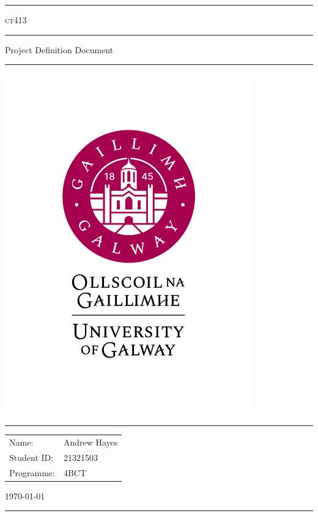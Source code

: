 \documentclass[a4paper,11pt]{article}
\author{Andrew Hayes}
\begin{document}
\begin{titlepage}
    \begin{center}
        \hrule
        \vspace*{0.6cm}
        \Huge \textsc{ct413}
        \vspace*{0.6cm}
        \hrule
        \LARGE
       \vspace{0.5cm}
       Project Definition Document
       \vspace{0.5cm}
       \hrule
       \vfill
       \centering
       \includegraphics[width=0.80\textwidth]{./images/University_Of_Galway_Logo__Positive_Portrait.png}
       \vfill
       \hrule
        \begin{minipage}{0.495\textwidth} 
            \vspace{0.4em}
            \raggedright
            \normalsize 
            \begin{tabular}{@{}l l}
                Name: & Andrew Hayes \\
                Student ID: & 21321503 \\
                Programme: & 4BCT
            \end{tabular}
        \end{minipage}
        \begin{minipage}{0.495\textwidth} 
            \raggedleft
            \vspace*{0.8cm}
            \Large
            \today
            \vspace*{0.6cm}
        \end{minipage}
        \medskip\hrule 
    \end{center}
\end{titlepage}
\end{document}
